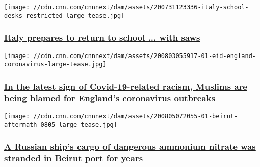 \texttt{[image: //cdn.cnn.com/cnnnext/dam/assets/200731123336-italy-school-desks-restricted-large-tease.jpg]}

\hypertarget{italy-prepares-to-return-to-school--with-saws}{%
\subsubsection{\texorpdfstring{\href{/2020/08/07/europe/italy-school-return-sawing-up-desks-coronavirus-intl/index.html}{Italy
prepares to return to school ... with
saws}}{Italy prepares to return to school ... with saws}}\label{italy-prepares-to-return-to-school--with-saws}}

\href{/2020/08/06/europe/muslims-coronavirus-england-islamophobia-gbr-intl/index.html}{}

\texttt{[image: //cdn.cnn.com/cnnnext/dam/assets/200803055917-01-eid-england-coronavirus-large-tease.jpg]}

\hypertarget{in-the-latest-sign-of-covid-19-related-racism-muslims-are-being-blamed-for-englands-coronavirus-outbreaks-1}{%
\subsubsection{\texorpdfstring{\href{/2020/08/06/europe/muslims-coronavirus-england-islamophobia-gbr-intl/index.html}{In
the latest sign of Covid-19-related racism, Muslims are being blamed for
England's coronavirus
outbreaks}}{In the latest sign of Covid-19-related racism, Muslims are being blamed for England's coronavirus outbreaks}}\label{in-the-latest-sign-of-covid-19-related-racism-muslims-are-being-blamed-for-englands-coronavirus-outbreaks-1}}

\href{/2020/08/05/europe/lebanon-russian-ship-blast-intl/index.html}{}

\texttt{[image: //cdn.cnn.com/cnnnext/dam/assets/200805072055-01-beirut-aftermath-0805-large-tease.jpg]}

\hypertarget{a-russian-ships-cargo-of-dangerous-ammonium-nitrate-was-stranded-in-beirut-port-for-years}{%
\subsubsection{\texorpdfstring{\href{/2020/08/05/europe/lebanon-russian-ship-blast-intl/index.html}{A
Russian ship's cargo of dangerous ammonium nitrate was stranded in
Beirut port for
years}}{A Russian ship's cargo of dangerous ammonium nitrate was stranded in Beirut port for years}}\label{a-russian-ships-cargo-of-dangerous-ammonium-nitrate-was-stranded-in-beirut-port-for-years}}

